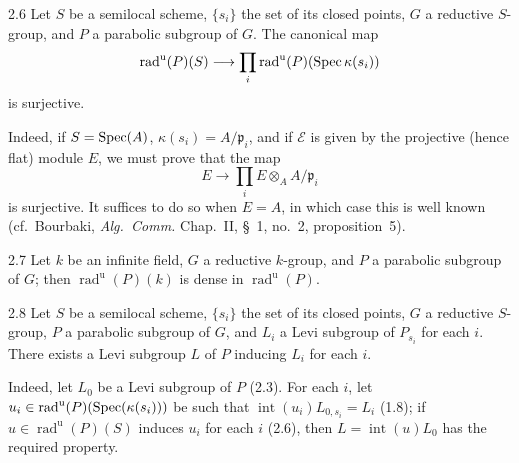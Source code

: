 \begin{corollary}{2.6}\label{XXVI.2.6}
Let $S$ be a semilocal scheme, $\{s_i\}$ the set of its closed points, $G$ a reductive $S$-group, and $P$ a parabolic subgroup of $G$. The canonical map
\[
\operatorname{rad}^{\mathrm u}(P)(S)\longrightarrow\prod_i\operatorname{rad}^{\mathrm u}(P)(\operatorname{Spec}\kappa(s_i))
\]
is surjective.
\end{corollary}
Indeed, if $S=\operatorname{Spec}(A)$, $\kappa(s_i)=A/\mathfrak p_i$, and if $\mathcal E$ is given by the projective (hence flat) module $E$, we must prove that the map
\[
E\to\prod_i E\otimes_A A/\mathfrak p_i
\]
is surjective. It suffices to do so when $E=A$, in which case this is well known (cf.~Bourbaki, \textit{Alg.~Comm.} Chap.~II, \S~1, no.~2, proposition~5).
\begin{corollary}{2.7}\label{XXVI.2.7}
Let $k$ be an infinite field, $G$ a reductive $k$-group, and $P$ a parabolic subgroup of $G$; then $\operatorname{rad}^{\mathrm u}(P)(k)$ is dense in $\operatorname{rad}^{\mathrm u}(P)$.
\end{corollary}
\begin{corollary}{2.8}\label{XXVI.2.8}
Let $S$ be a semilocal scheme, $\{s_i\}$ the set of its closed points, $G$ a reductive $S$-group, $P$ a parabolic subgroup of $G$, and $L_i$ a Levi subgroup of $P_{s_i}$ for each $i$. There exists a Levi subgroup $L$ of $P$ inducing $L_i$ for each $i$.
\end{corollary}
Indeed, let $L_0$ be a Levi subgroup of $P$ (2.3). For each $i$, let $u_i\in\operatorname{rad}^{\mathrm u}(P)(\operatorname{Spec}(\kappa(s_i)))$ be such that $\operatorname{int}(u_i)L_{0,s_i}=L_i$ (1.8); if $u\in\operatorname{rad}^{\mathrm u}(P)(S)$ induces $u_i$ for each $i$ (2.6), then $L=\operatorname{int}(u)L_0$ has the required property.

